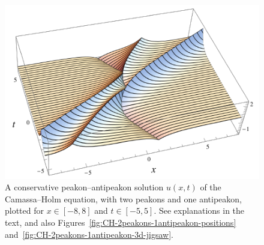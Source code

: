\documentclass[10pt,a4paper]{article} \pdfoutput=1 
\begin{document}
\begin{figure}
  \centering
  \includegraphics[width=0.95\linewidth]{graphics/CH-2peakons-1antipeakon-3d-labels.pdf}
  \caption{A conservative peakon--antipeakon solution $u(x,t)$
    of the Camassa--Holm equation,
    with two peakons and one antipeakon,
    plotted for $x \in [-8,8]$ and $t \in [-5,5]$.
    See explanations in the text,
    and also Figures~\ref{fig:CH-2peakons-1antipeakon-positions}
    and~\ref{fig:CH-2peakons-1antipeakon-3d-jigsaw}.
  }
  \label{fig:CH-2peakons-1antipeakon-3d}
\end{figure}
\end{document}
